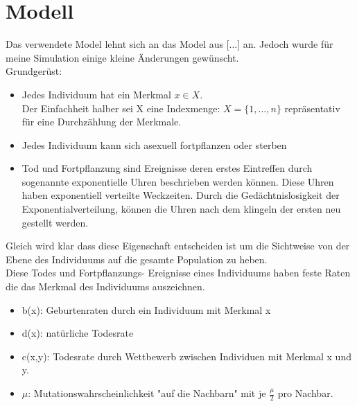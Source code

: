 \documentclass[11pt, a4paper, german]{article}
\begin{document}

\section{Modell}
Das verwendete Model lehnt sich an das Model aus [...] an. Jedoch wurde für meine Simulation einige kleine Änderungen gewünscht.\\
Grundgerüst:
	\begin{itemize}
		\item Jedes Individuum hat ein Merkmal $ x \in X $. \\
		Der Einfachheit halber sei X eine Indexmenge: $ X = \{1,\dots, n\} $ repräsentativ für eine Durchzählung der Merkmale.
		\item Jedes Individuum kann sich asexuell fortpflanzen oder sterben
		\item Tod und Fortpflanzung sind Ereignisse deren erstes Eintreffen durch sogenannte exponentielle Uhren beschrieben werden können. Diese Uhren haben exponentiell verteilte Weckzeiten. Durch die Gedächtnislosigkeit der Exponentialverteilung, können die Uhren nach dem klingeln der ersten neu gestellt werden. 
	\end{itemize}
	Gleich wird klar dass diese Eigenschaft entscheiden ist um die Sichtweise von der Ebene des Individuums auf die gesamte Population zu heben.\\
	Diese Todes und Fortpflanzungs- Ereignisse eines Individuums haben feste Raten die das Merkmal des Individuums auszeichnen.
	\begin{itemize}
		\item b(x): Geburtenraten durch ein Individuum mit Merkmal x
		\item d(x): natürliche Todesrate
		\item c(x,y): Todesrate durch Wettbewerb zwischen Individuen mit Merkmal x und y.
		\item $ \mu $: Mutationswahrscheinlichkeit "{}auf die Nachbarn"{} mit je $ \frac{\mu}{2} $ pro Nachbar. 
	\end{itemize}
\end{document}
